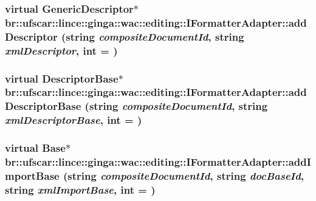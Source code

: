 \hypertarget{classbr_1_1ufscar_1_1lince_1_1ginga_1_1wac_1_1editing_1_1IFormatterAdapter_a019d61ae0261d24cd89e6af449bc8bdb}{
\subsubsection[{addDescriptor}]{\setlength{\rightskip}{0pt plus 5cm}virtual GenericDescriptor$\ast$ br::ufscar::lince::ginga::wac::editing::IFormatterAdapter::addDescriptor (string {\em compositeDocumentId}, \/  string {\em xmlDescriptor}, \/  int = {})}}
\label{classbr_1_1ufscar_1_1lince_1_1ginga_1_1wac_1_1editing_1_1IFormatterAdapter_a019d61ae0261d24cd89e6af449bc8bdb}
\hypertarget{classbr_1_1ufscar_1_1lince_1_1ginga_1_1wac_1_1editing_1_1IFormatterAdapter_a22f741245601c4b74a962755657e97de}{
\subsubsection[{addDescriptorBase}]{\setlength{\rightskip}{0pt plus 5cm}virtual DescriptorBase$\ast$ br::ufscar::lince::ginga::wac::editing::IFormatterAdapter::addDescriptorBase (string {\em compositeDocumentId}, \/  string {\em xmlDescriptorBase}, \/  int = {})}}
\label{classbr_1_1ufscar_1_1lince_1_1ginga_1_1wac_1_1editing_1_1IFormatterAdapter_a22f741245601c4b74a962755657e97de}
\hypertarget{classbr_1_1ufscar_1_1lince_1_1ginga_1_1wac_1_1editing_1_1IFormatterAdapter_ad9633e31a4cf3ec03f2e98cbad6567e3}{
\subsubsection[{addImportBase}]{\setlength{\rightskip}{0pt plus 5cm}virtual Base$\ast$ br::ufscar::lince::ginga::wac::editing::IFormatterAdapter::addImportBase (string {\em compositeDocumentId}, \/  string {\em docBaseId}, \/  string {\em xmlImportBase}, \/  int = {})}}
